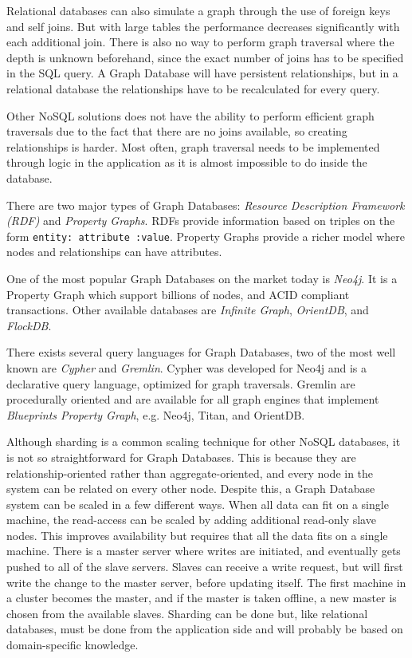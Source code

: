 Relational databases can also simulate a graph through the use of foreign keys and self joins. But with large tables the performance decreases significantly with each additional join. There is also no way to perform graph traversal where the depth is unknown beforehand, since the exact number of joins has to be specified in the SQL query. A Graph Database will have persistent relationships, but in a relational database the relationships have to be recalculated for every query.

Other NoSQL solutions does not have the ability to perform efficient graph traversals due to the fact that there are no joins available, so creating relationships is harder. Most often, graph traversal needs to be implemented through logic in the application as it is almost impossible to do inside the database.

There are two major types of Graph Databases: \emph{Resource Description Framework (RDF)} and \emph{Property Graphs}. RDFs provide information based on triples on the form \texttt{entity: attribute :value}. Property Graphs provide a richer model where nodes and relationships can have attributes.

One of the most popular Graph Databases on the market today is \emph{Neo4j}. It is a Property Graph which support billions of nodes, and ACID compliant transactions. Other available databases are \emph{Infinite Graph}, \emph{OrientDB}, and \emph{FlockDB}.

There exists several query languages for Graph Databases, two of the most well known are \emph{Cypher} and \emph{Gremlin}. Cypher was developed for Neo4j and is a declarative query language, optimized for graph traversals. Gremlin are procedurally oriented and are available for all graph engines that implement \emph{Blueprints Property Graph}, e.g. Neo4j, Titan, and OrientDB.

Although sharding is a common scaling technique for other NoSQL databases, it is not so straightforward for Graph Databases. This is because they are relationship-oriented rather than aggregate-oriented, and every node in the system can be related on every other node. Despite this, a Graph Database system can be scaled in a few different ways. When all data can fit on a single machine, the read-access can be scaled by adding additional read-only slave nodes. This improves availability but requires that all the data fits on a single machine. There is a master server where writes are initiated, and eventually gets pushed to all of the slave servers. Slaves can receive a write request, but will first write the change to the master server, before updating itself. The first machine in a cluster becomes the master, and if the master is taken offline, a new master is chosen from the available slaves. Sharding can be done but, like relational databases, must be done from the application side and will probably be based on domain-specific knowledge.

